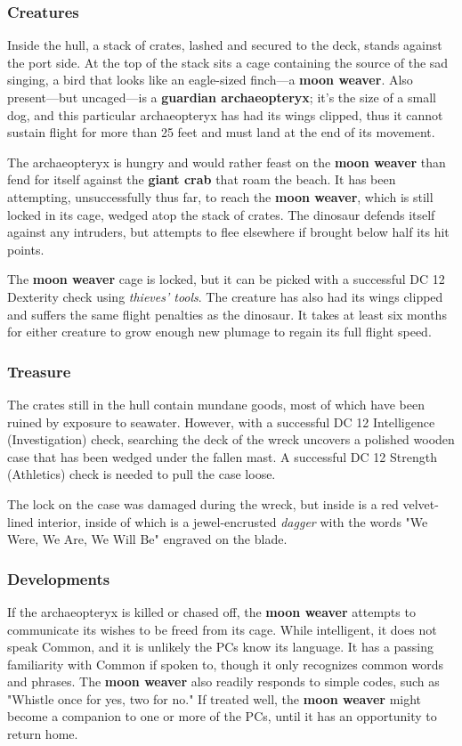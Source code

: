 \documentclass[10pt,a4paper,twoside,bg=print,twocolumn,openany,nodeprecatedcode]{dndbook}
\begin{document}
\subsubsection{Creatures}
Inside the hull, a stack of crates, lashed and secured to the deck, stands against the port side. At the top of the stack sits a cage containing the source of the sad singing, a bird that looks like an eagle-sized finch—a \textbf{moon weaver}. Also present—but uncaged—is a \textbf{guardian archaeopteryx}; it's the size of a small dog, and this particular archaeopteryx has had its wings clipped, thus it cannot sustain flight for more than 25 feet and must land at the end of its movement.

The archaeopteryx is hungry and would rather feast on the \textbf{moon weaver} than fend for itself against the \textbf{giant crab} that roam the beach. It has been attempting, unsuccessfully thus far, to reach the \textbf{moon weaver}, which is still locked in its cage, wedged atop the stack of crates. The dinosaur defends itself against any intruders, but attempts to flee elsewhere if brought below half its hit points.

The \textbf{moon weaver} cage is locked, but it can be picked with a successful DC 12 Dexterity check using \textit{thieves' tools}. The creature has also had its wings clipped and suffers the same flight penalties as the dinosaur. It takes at least six months for either creature to grow enough new plumage to regain its full flight speed.

\subsubsection{Treasure}
The crates still in the hull contain mundane goods, most of which have been ruined by exposure to seawater. However, with a successful DC 12 Intelligence (Investigation) check, searching the deck of the wreck uncovers a polished wooden case that has been wedged under the fallen mast. A successful DC 12 Strength (Athletics) check is needed to pull the case loose.

The lock on the case was damaged during the wreck, but inside is a red velvet-lined interior, inside of which is a jewel-encrusted \textit{dagger} with the words "We Were, We Are, We Will Be" engraved on the blade.

\subsubsection{Developments}
If the archaeopteryx is killed or chased off, the \textbf{moon weaver} attempts to communicate its wishes to be freed from its cage. While intelligent, it does not speak Common, and it is unlikely the PCs know its language. It has a passing familiarity with Common if spoken to, though it only recognizes common words and phrases. The \textbf{moon weaver} also readily responds to simple codes, such as "Whistle once for yes, two for no." If treated well, the \textbf{moon weaver} might become a companion to one or more of the PCs, until it has an opportunity to return home.
\end{document}
